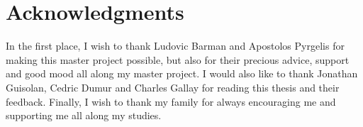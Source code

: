 \chapter{Acknowledgments}
In the first place, I wish to thank Ludovic Barman and Apostolos Pyrgelis for making this master project possible, but also for their precious advice, support and good mood all along my master project. I would also like to thank Jonathan Guisolan, Cedric Dumur and Charles Gallay for reading this thesis and their feedback. Finally, I wish to thank my family for always encouraging me and supporting me all along my studies.
